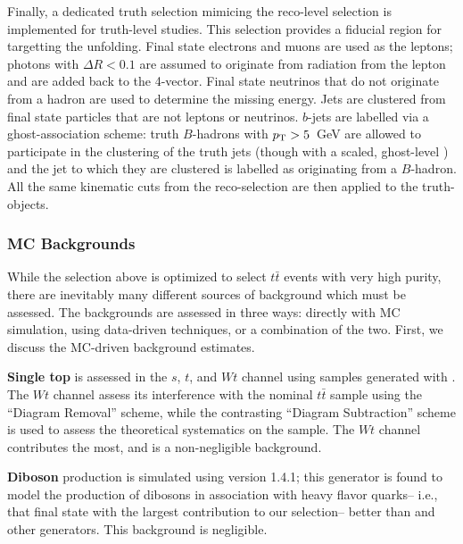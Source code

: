 
Finally, a dedicated truth selection mimicing the reco-level selection is implemented for truth-level studies. This selection provides a fiducial region for targetting the unfolding. Final state electrons and muons are used as the leptons; photons with $\Delta R < 0.1$ are assumed to originate from radiation from the lepton and are added back to the 4-vector. Final state neutrinos that do not originate from a hadron are used to determine the missing energy. Jets are clustered from final state particles that are not leptons or neutrinos. $b$-jets are labelled via a ghost-association scheme: truth $B$-hadrons with $p_{\text{T}} > 5$~GeV are allowed to participate in the clustering of the truth jets (though with a scaled, ghost-level \pt) and the jet to which they are clustered is labelled as originating from a $B$-hadron. All the same kinematic cuts from the reco-selection are then applied to the truth-objects.

\subsubsection{MC Backgrounds}

While the selection above is optimized to select $t\bar{t}$ events with very high purity, there are inevitably many different sources of background which must be assessed. The backgrounds are assessed in three ways: directly with MC simulation, using data-driven techniques, or a combination of the two. First, we discuss the MC-driven background estimates.

\textbf{Single top} is assessed in the $s$, $t$, and $Wt$ channel using samples generated with \PowPythia. The $Wt$ channel assess its interference with the nominal $t\bar{t}$ sample using the ``Diagram Removal'' scheme, while the contrasting ``Diagram Subtraction'' scheme is used to assess the theoretical systematics on the sample. The $Wt$ channel contributes the most, and is a non-negligible background.

\textbf{Diboson} production is simulated using \Sherpa version 1.4.1; this generator is found to model the production of dibosons in association with heavy flavor quarks-- i.e., that final state with the largest contribution to our selection-- better than \Herwigpp and other generators. This background is negligible.

